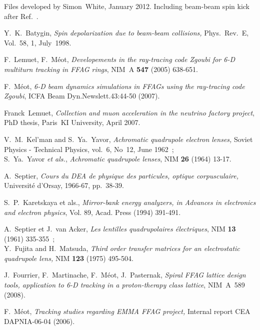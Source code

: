 \begin{thebibliography}{99}
\newpage



 Files developed by Simon~White, January 2012. Including beam-beam spin kick after Ref.~\cite{YKBatyginSpin}. 

Y.~K.~Batygin, 
\textsl{Spin depolarization due to beam-beam collisions, } 
Phys.~Rev.~E, Vol.~58,  1, July~1998. 

F.~Lemuet, F.~M\'eot, 
\textsl{Developements in the ray-tracing code Zgoubi for 6-D multiturn tracking in FFAG rings}, 
NIM~A \textbf{547} (2005) 638-651. 

 F.~M\'eot,  
\textsl{6-D beam dynamics simulations in FFAGs using the ray-tracing code Zgoubi}, 
ICFA Beam Dyn.Newslett.43:44-50 (2007).

Franck~Lemuet, 
\textsl{Collection and muon acceleration in the neutrino factory project}, 
PhD thesis, Paris~KI University, April 2007. 

V.~M.~Kel'man and S.~Ya.~Yavor, 
\textsl{Achromatic quadrupole electron lenses, } 
Soviet Physics - Technical Physics, vol.~6, No~12, June 1962~; \\
S.~Ya.~Yavor \textsl{et als.}, 
\textsl{Achromatic quadrupole lenses}, 
NIM \textbf{26} (1964) 13-17. 

A.~Septier, 
\textsl{Cours du DEA de physique des particules, optique corpusculaire,}  
Universit\'e d'Orsay, 1966-67, pp.~38-39.  

S.~P.~Karetskaya et als., 
\textsl{Mirror-bank energy analyzers, in Advances in electronics and electron physics}, 
Vol. 89, Acad. Press (1994) 391-491. 

A.~Septier et J.~van Acker, 
\textsl{Les lentilles quadrupolaires \'electriques}, 
NIM \textbf{13} (1961) 335-355~; \\
Y.~Fujita and H.~Matsuda, 
\textsl{Third order transfer matrices for an electrostatic quadrupole lens,} 
NIM \textbf{123} (1975) 495-504. 

J.~Fourrier, F.~Martinache, F.~M\'eot, J.~Pasternak, 
\textsl{Spiral FFAG lattice design tools,  application to 6-D tracking in a proton-therapy class lattice}, 
NIM~A~589 (2008). 

F.~M\'eot, 
\textsl{Tracking studies regarding EMMA FFAG project, }
Internal report CEA DAPNIA-06-04 (2006). 


\end{thebibliography}
